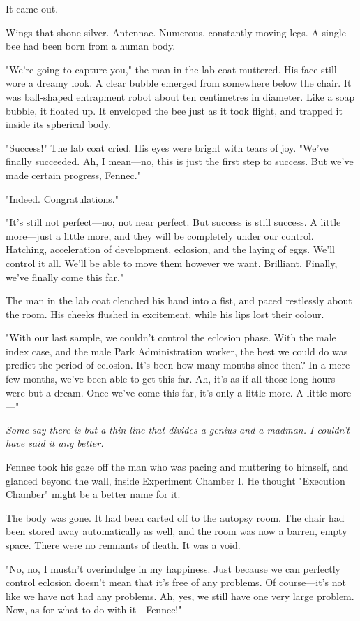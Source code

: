 It came out.

Wings that shone silver. Antennae. Numerous, constantly moving legs. A
single bee had been born from a human body.

"We're going to capture you," the man in the lab coat muttered. His face
still wore a dreamy look. A clear bubble emerged from somewhere below
the chair. It was ball-shaped entrapment robot about ten centimetres in
diameter. Like a soap bubble, it floated up. It enveloped the bee just
as it took flight, and trapped it inside its spherical body.

"Success!" The lab coat cried. His eyes were bright with tears of joy.
"We've finally succeeded. Ah, I mean---no, this is just the first step to
success. But we've made certain progress, Fennec."

"Indeed. Congratulations."

"It's still not perfect---no, not near perfect. But success is still
success. A little more---just a little more, and they will be completely
under our control. Hatching, acceleration of development, eclosion, and
the laying of eggs. We'll control it all. We'll be able to move them
however we want. Brilliant. Finally, we've finally come this far."

The man in the lab coat clenched his hand into a fist, and paced
restlessly about the room. His cheeks flushed in excitement, while his
lips lost their colour.

"With our last sample, we couldn't control the eclosion phase. With the
male index case, and the male Park Administration worker, the best we
could do was predict the period of eclosion. It's been how many months
since then? In a mere few months, we've been able to get this far. Ah,
it's as if all those long hours were but a dream. Once we've come this
far, it's only a little more. A little more---"

\emph{Some say there is but a thin line that divides a genius and a madman.
I couldn't have said it any better.}

Fennec took his gaze off the man who was pacing and muttering to
himself, and glanced beyond the wall, inside Experiment Chamber I. He
thought "Execution Chamber" might be a better name for it.~

The body was gone. It had been carted off to the autopsy room. The chair
had been stored away automatically as well, and the room was now a
barren, empty space. There were no remnants of death. It was a void.

"No, no, I mustn't overindulge in my happiness. Just because we can
perfectly control eclosion doesn't mean that it's free of any problems.
Of course---it's not like we have not had any problems. Ah, yes, we still
have one very large problem. Now, as for what to do with it---Fennec!"

